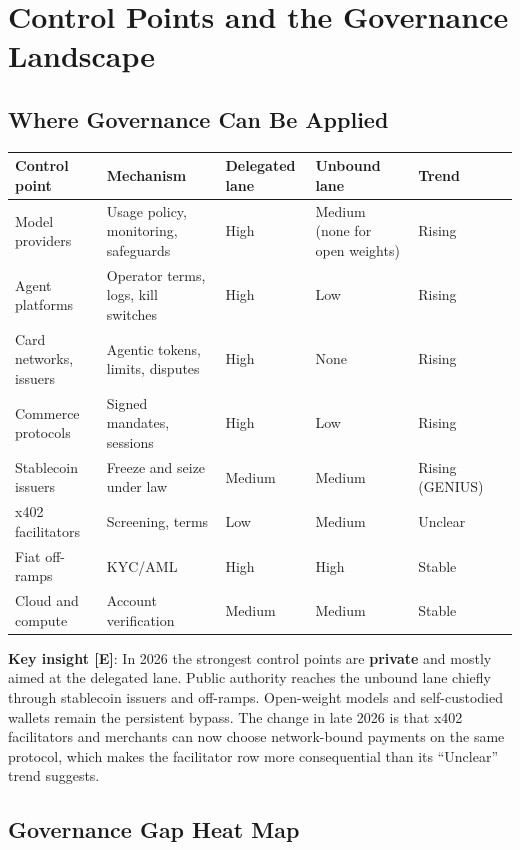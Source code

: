 \documentclass[11pt,letterpaper]{article}
\begin{document}
\section{Control Points and the Governance Landscape}
\label{sec:control}

\subsection{Where Governance Can Be Applied}

\begin{center}
\small
\begin{tabularx}{\linewidth}{ZY{1.16}Y{1.44}Y{0.88}Y{0.88}Y{0.64}}
\toprule
\textbf{Control point} & \textbf{Mechanism} & \textbf{Delegated lane} & \textbf{Unbound lane} & \textbf{Trend} \\
\midrule
Model providers & Usage policy, monitoring, safeguards & High & Medium (none for open weights) & Rising \\
Agent platforms & Operator terms, logs, kill switches & High & Low & Rising \\
Card networks, issuers & Agentic tokens, limits, disputes & High & None & Rising \\
Commerce protocols & Signed mandates, sessions & High & Low & Rising \\
Stablecoin issuers & Freeze and seize under law & Medium & Medium & Rising (GENIUS) \\
x402 facilitators & Screening, terms & Low & Medium & Unclear \\
Fiat off-ramps & KYC/AML & High & High & Stable \\
Cloud and compute & Account verification & Medium & Medium & Stable \\
\bottomrule
\end{tabularx}
\end{center}

\textbf{Key insight [E]}: In 2026 the strongest control points are \textbf{private} and mostly aimed at the delegated lane. Public authority reaches the unbound lane chiefly through stablecoin issuers and off-ramps. Open-weight models and self-custodied wallets remain the persistent bypass. The change in late 2026 is that x402 facilitators and merchants can now choose network-bound payments on the same protocol, which makes the facilitator row more consequential than its ``Unclear'' trend suggests.

\subsection{Governance Gap Heat Map}
\end{document}
